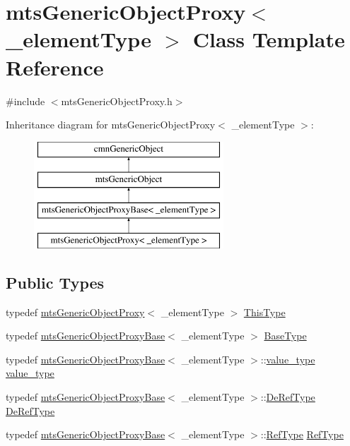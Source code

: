 \hypertarget{classmts_generic_object_proxy}{}\section{mts\+Generic\+Object\+Proxy$<$ \+\_\+element\+Type $>$ Class Template Reference}
\label{classmts_generic_object_proxy}


{\ttfamily \#include $<$mts\+Generic\+Object\+Proxy.\+h$>$}

Inheritance diagram for mts\+Generic\+Object\+Proxy$<$ \+\_\+element\+Type $>$\+:\begin{figure}[H]
\begin{center}
\leavevmode
\includegraphics[height=4.000000cm]{d9/d3b/classmts_generic_object_proxy}
\end{center}
\end{figure}
\subsection*{Public Types}
\begin{DoxyCompactItemize}
\item 
typedef \hyperlink{classmts_generic_object_proxy}{mts\+Generic\+Object\+Proxy}$<$ \+\_\+element\+Type $>$ \hyperlink{classmts_generic_object_proxy_a03ddcddca7f7515d81de5a0031d175a2}{This\+Type}
\item 
typedef \hyperlink{classmts_generic_object_proxy_base}{mts\+Generic\+Object\+Proxy\+Base}$<$ \+\_\+element\+Type $>$ \hyperlink{classmts_generic_object_proxy_a8635f88c647c718cee6f7760529c27a5}{Base\+Type}
\item 
typedef \hyperlink{classmts_generic_object_proxy_base}{mts\+Generic\+Object\+Proxy\+Base}$<$ \+\_\+element\+Type $>$\+::\hyperlink{classmts_generic_object_proxy_a4c47d4b184e02d7443de1face033af34}{value\+\_\+type} \hyperlink{classmts_generic_object_proxy_a4c47d4b184e02d7443de1face033af34}{value\+\_\+type}
\item 
typedef \hyperlink{classmts_generic_object_proxy_base}{mts\+Generic\+Object\+Proxy\+Base}$<$ \+\_\+element\+Type $>$\+::\hyperlink{classmts_generic_object_proxy_base_ac87827bf98fee558160a8985c41f4126}{De\+Ref\+Type} \hyperlink{classmts_generic_object_proxy_a5bab9bef15f9fef5e51f0060cf50e8d5}{De\+Ref\+Type}
\item 
typedef \hyperlink{classmts_generic_object_proxy_base}{mts\+Generic\+Object\+Proxy\+Base}$<$ \+\_\+element\+Type $>$\+::\hyperlink{classmts_generic_object_proxy_base_adddd01c8aea004bf5f0a5894438970c9}{Ref\+Type} \hyperlink{classmts_generic_object_proxy_aa1632a227bbb41bbfaeb4b2ccd90ed6a}{Ref\+Type}
\end{DoxyCompactItemize}
